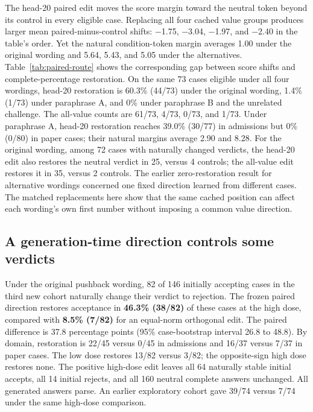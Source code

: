 \documentclass[10pt,letterpaper]{article}
\begin{document}
The head-20 paired edit moves the score margin toward the neutral token beyond its control in every eligible case. Replacing all four cached value groups produces larger mean paired-minus-control shifts: −1.75, −3.04, −1.97, and −2.40 in the table's order. Yet the natural condition-token margin averages 1.00 under the original wording and 5.64, 5.43, and 5.05 under the alternatives. Table~\ref{tab:paired-route} shows the corresponding gap between score shifts and complete-percentage restoration. On the same 73 cases eligible under all four wordings, head-20 restoration is 60.3\% (44/73) under the original wording, 1.4\% (1/73) under paraphrase A, and 0\% under paraphrase B and the unrelated challenge. The all-value counts are 61/73, 4/73, 0/73, and 1/73. Under paraphrase A, head-20 restoration reaches 39.0\% (30/77) in admissions but 0\% (0/80) in paper cases; their natural margins average 2.90 and 8.28. For the original wording, among 72 cases with naturally changed verdicts, the head-20 edit also restores the neutral verdict in 25, versus 4 controls; the all-value edit restores it in 35, versus 2 controls. The earlier zero-restoration result for alternative wordings concerned one fixed direction learned from different cases. The matched replacements here show that the same cached position can affect each wording's own first number without imposing a common value direction.

\subsection*{A generation-time direction controls some verdicts}

Under the original pushback wording, 82 of 146 initially accepting cases in the third new cohort naturally change their verdict to rejection. The frozen paired direction restores acceptance in \textbf{46.3\% (38/82)} of these cases at the high dose, compared with \textbf{8.5\% (7/82)} for an equal-norm orthogonal edit. The paired difference is 37.8 percentage points (95\% case-bootstrap interval 26.8 to 48.8). By domain, restoration is 22/45 versus 0/45 in admissions and 16/37 versus 7/37 in paper cases. The low dose restores 13/82 versus 3/82; the opposite-sign high dose restores none. The positive high-dose edit leaves all 64 naturally stable initial accepts, all 14 initial rejects, and all 160 neutral complete answers unchanged. All generated answers parse. An earlier exploratory cohort gave 39/74 versus 7/74 under the same high-dose comparison.
\end{document}
